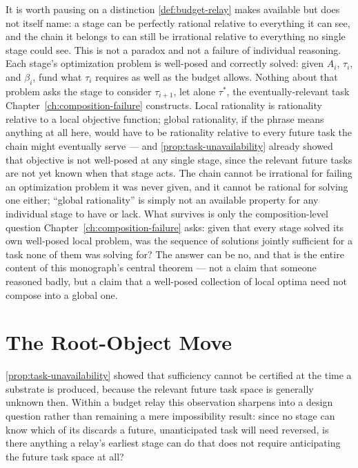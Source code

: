 It is worth pausing on a distinction \cref{def:budget-relay} makes
available but does not itself name: a stage can be perfectly rational
relative to everything it can see, and the chain it belongs to can still
be irrational relative to everything no single stage could see. This is
not a paradox and not a failure of individual reasoning. Each stage's
optimization problem is well-posed and correctly solved: given $A_i$,
$\tau_i$, and $\beta_i$, fund what $\tau_i$ requires as well as the
budget allows. Nothing about that problem asks the stage to consider
$\tau_{i+1}$, let alone $\tau^*$, the eventually-relevant task
Chapter~\ref{ch:composition-failure} constructs. Local rationality is
rationality relative to a local objective function; global rationality,
if the phrase means anything at all here, would have to be rationality
relative to every future task the chain might eventually serve --- and
\cref{prop:task-unavailability} already showed that objective is not
well-posed at any single stage, since the relevant future tasks are not
yet known when that stage acts. The chain cannot be irrational for
failing an optimization problem it was never given, and it cannot be
rational for solving one either; ``global rationality'' is simply not
an available property for any individual stage to have or lack. What
survives is only the composition-level question Chapter~\ref{ch:composition-failure}
asks: given that every stage solved its own well-posed local problem, was
the sequence of solutions jointly sufficient for a task none of them
was solving for? The answer can be no, and that is the entire content of
this monograph's central theorem --- not a claim that someone reasoned
badly, but a claim that a well-posed collection of local optima need not
compose into a global one.

\section{The Root-Object Move}

\cref{prop:task-unavailability} showed that sufficiency cannot be
certified at the time a substrate is produced, because the relevant future
task space is generally unknown then. Within a budget relay this
observation sharpens into a design question rather than remaining a mere
impossibility result: since no stage can know which of its discards a
future, unanticipated task will need reversed, is there anything a relay's
earliest stage can do that does not require anticipating the future task
space at all?

